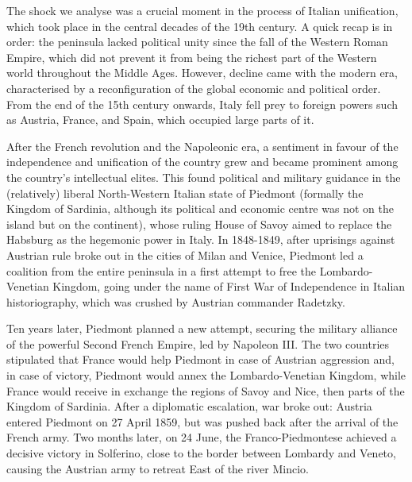 The shock we analyse was a crucial moment in the process of Italian unification, which took place in the central decades of the 19th century.
A quick recap is in order: the peninsula lacked political unity since the fall of the Western Roman Empire, which did not prevent it from being the richest part of the Western world throughout the Middle Ages. 
However, decline came with the modern era, characterised by %
a reconfiguration of the global economic and political  order. 
From the end of the 15th century onwards, Italy fell prey to foreign powers such as Austria, France, and Spain, which occupied large parts of it.

After the French revolution and the Napoleonic era, a sentiment in favour of the independence and unification of the country grew and became prominent among the country's intellectual elites. 
This found political and military guidance in the (relatively) liberal North-Western Italian state of Piedmont (formally the Kingdom of Sardinia, although its political and economic centre was not on the island but on the continent), whose ruling House of Savoy aimed to replace the Habsburg as the hegemonic power in Italy. 
In 1848-1849, after uprisings against Austrian rule broke out in the cities of Milan and Venice, Piedmont led a coalition %
from the entire peninsula in a first attempt to free the Lombardo-Venetian Kingdom, going under the name of First War of Independence in Italian historiography, which was crushed by Austrian commander Radetzky. 

Ten years later, Piedmont planned a new attempt, securing the military alliance of the powerful Second French Empire, led by Napoleon III. 
The two countries stipulated that France would help Piedmont in case of Austrian aggression and, in case of victory, Piedmont would annex the Lombardo-Venetian Kingdom, while France would receive in exchange the regions of Savoy and Nice, then parts of the Kingdom of Sardinia.
After a diplomatic escalation, war broke out: Austria entered Piedmont on 27 April 1859, but was pushed back after the arrival of the French army. 
Two months later, on 24 June, the Franco-Piedmontese achieved a decisive victory in Solferino, close to the border between Lombardy and Veneto, causing the Austrian army to retreat East of the river Mincio. 

